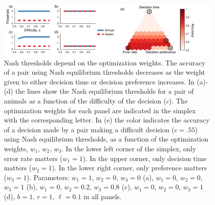 \documentclass{pnastwo}
\begin{document}
\begin{figure}[htp]
\includegraphics[width=6.83in]{Figure1.pdf}
\caption{\label{nasheq} Nash thresholds depend on the optimization weights. The accuracy of a pair using Nash equilibrium thresholds decreases as the weight given to either decision time or decision preference increases.  In (a)-(d) the lines show the Nash equilibrium thresholds for a pair of animals as a function of the difficulty of the decision ($c$). The optimization weights for each panel are indicated in the simplex with the corresponding letter. In (e) the color indicates the accuracy of a decision made by a pair making a difficult decision ($c=.55$) using Nash equilibrium thresholds, as a function of the optimization weights, $w_1$, $w_2$, $w_3$.  In the lower left corner of the simplex, only error rate matters ($w_1=1$).  In the upper corner, only decision time matters ($w_2=1$).  In the lower right corner, only preference matters ($w_3=1$). Parameters: $w_1=1$, $w_2=0$, $w_3=0$ (a), $w_1=0$, $w_2=0$, $w_3=1$ (b), $w_1=0$, $w_2=0.2$, $w_3=0.8$ (c), $w_1=0$, $w_2=0$, $w_3=1$ (d), $b=1$, $r=1$, $\ell=0.1$ in all panels. }
\end{figure}
\end{document}
